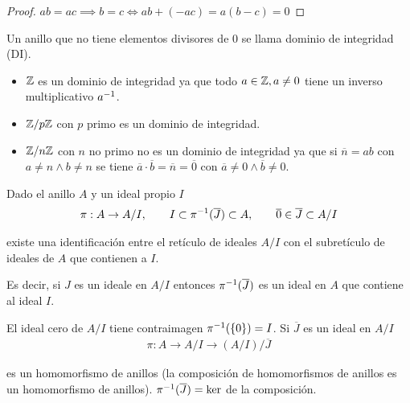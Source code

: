 \begin{proof}
	$ab = ac \implies b = c \iff ab + (-ac) = a(b -c) = 0$
\end{proof}

\begin{dfn}
	Un anillo que no tiene elementos divisores de 0 se llama dominio de integridad (DI).
\end{dfn}

\begin{ej}
	\begin{itemize}
		\item $\mathbb{Z}$ es un dominio de integridad ya que todo $a \in \mathbb{Z}, a \neq 0$ tiene un inverso multiplicativo $a^{-1}$.
		\item $\mathbb{Z}/p\mathbb{Z}$ con $p$ primo es un dominio de integridad.
		\item $\mathbb{Z}/n\mathbb{Z}$ con $n$ no primo no es un dominio de integridad ya que si $\overline n = ab$ con $a \neq n \land b \neq n$ se tiene $\overline{a} \cdot \overline{b} = \overline{n} = \overline{0}$ con $\overline{a} \neq 0 \land \overline{b} \neq 0$.
	\end{itemize}
\end{ej}


\begin{thm}
	Dado el anillo $A$ y un ideal propio $I$
	\begin{align*}
		\pi: A \to A/I,\qquad I \subset \pi^{-1}(\overline{J}) \subset A,\qquad \overline{0} \in \overline{J} \subset A / I
	\end{align*}
	
	existe una identificación entre el retículo de ideales $A / I$ con el subretículo de ideales de $A$ que contienen a $I$. 
	
	Es decir, si $J$ es un ideale en $A/I$ entonces $\pi^{-1}(\overline{J})$ es un ideal en $A$ que contiene al ideal $I$.
\end{thm}


El ideal cero de $A/I$ tiene contraimagen $\pi^{-1}(\{0\}) = I$. Si $\overline{J}$ es un ideal en $A/I$
\begin{align*}
	\pi : A \to A/I \to (A/I) / \overline{J}
\end{align*}

es un homomorfismo de anillos (la composición de homomorfismos de anillos es un homomorfismo de anillos). $\pi^{-1}(\overline{J}) = \ker$ de la composición.


